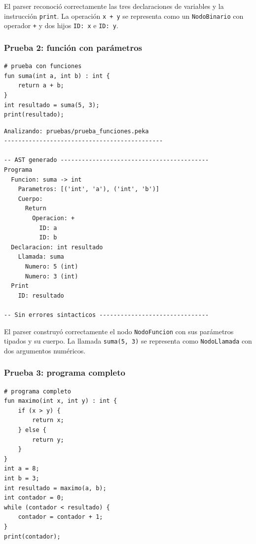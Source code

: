 \documentclass[12pt]{article}
\begin{document}
\noindent
El parser reconoció correctamente las tres declaraciones de variables y
la instrucción \texttt{print}. La operación \texttt{x + y} se representa
como un \texttt{NodoBinario} con operador \texttt{+} y dos hijos
\texttt{ID: x} e \texttt{ID: y}.

\subsubsection{Prueba 2: función con parámetros}

\begin{lstlisting}[caption={prueba\_funciones.peka}]
# prueba con funciones
fun suma(int a, int b) : int {
    return a + b;
}
int resultado = suma(5, 3);
print(resultado);
\end{lstlisting}

\begin{lstlisting}[caption={AST generado -- prueba\_funciones.peka}]
Analizando: pruebas/prueba_funciones.peka
---------------------------------------------

-- AST generado ------------------------------------------
Programa
  Funcion: suma -> int
    Parametros: [('int', 'a'), ('int', 'b')]
    Cuerpo:
      Return
        Operacion: +
          ID: a
          ID: b
  Declaracion: int resultado
    Llamada: suma
      Numero: 5 (int)
      Numero: 3 (int)
  Print
    ID: resultado

-- Sin errores sintacticos -------------------------------
\end{lstlisting}

\noindent
El parser construyó correctamente el nodo \texttt{NodoFuncion} con sus
parámetros tipados y su cuerpo. La llamada \texttt{suma(5, 3)} se
representa como \texttt{NodoLlamada} con dos argumentos numéricos.

\subsubsection{Prueba 3: programa completo}

\begin{lstlisting}[caption={prueba\_completa.peka}]
# programa completo
fun maximo(int x, int y) : int {
    if (x > y) {
        return x;
    } else {
        return y;
    }
}
int a = 8;
int b = 3;
int resultado = maximo(a, b);
int contador = 0;
while (contador < resultado) {
    contador = contador + 1;
}
print(contador);
\end{lstlisting}
\end{document}
